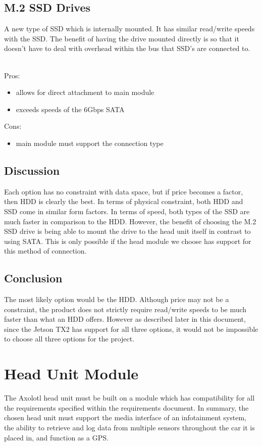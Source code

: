 \documentclass[onecolumn, draftclsnofoot,10pt, compsoc]{IEEEtran}
\begin{document}
\subsection{M.2 SSD Drives}
A new type of SSD which is internally mounted. It has similar read/write speeds with the SSD. The benefit of having the drive mounted directly is so that it doesn't have to deal with overhead within the bus that SSD's are connected to. 
~\cite{m.2:information}
~\cite{m.2:information2}

Pros:
\begin{itemize}
    \item allows for direct attachment to main module
    \item exceeds speeds of the 6Gbps SATA
\end{itemize}

Cons:
\begin{itemize}
    \item main module must support the connection type
\end{itemize}

\subsection{Discussion}
Each option has no constraint with data space, but if price becomes a factor, then HDD is clearly the best.
In terms of physical constraint, both HDD and SSD come in similar form factors.
In terms of speed, both types of the SSD are much faster in comparison to the HDD. 
However, the benefit of choosing the M.2 SSD drive is being able to mount the drive to the head unit itself in contrast to using SATA. This is only possible if the head module we choose has support for this method of connection.

\subsection{Conclusion}
The most likely option would be the HDD. Although price may not be a constraint, the product does not strictly require read/write speeds to be much faster than what an HDD offers. However as described later in this document, since the Jetson TX2 has support for all three options, it would not be impossible to choose all three options for the project.

\section{Head Unit Module}
The Axolotl head unit must be built on a module which has compatibility for all the requirements specified within the requirements document. In summary, the chosen head unit must support the media interface of an infotainment system, the ability to retrieve and log data from multiple sensors throughout the car it is placed in, and function as a GPS. 
\end{document}
